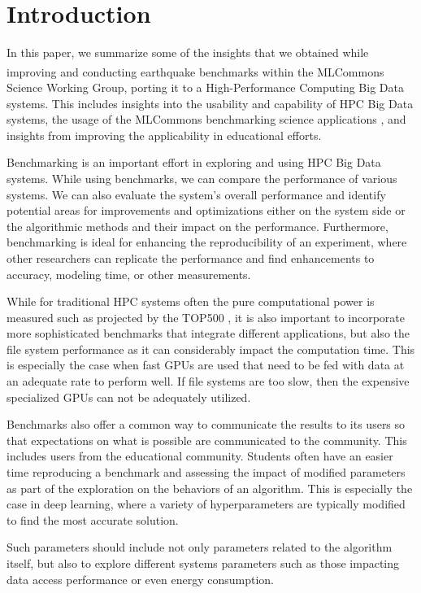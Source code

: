 \documentclass[utf8]{FrontiersinVancouver} %
\begin{document}
\section{Introduction}


In this paper, we summarize some of the insights that we obtained while improving and conducting earthquake benchmarks within the MLCommons\textsuperscript{\texttrademark} Science Working Group, porting it to a High-Performance Computing Big Data systems.  This includes insights into the usability and capability of HPC Big Data systems, the usage of the MLCommons benchmarking science applications \citep{las-22-mlcommons-science}, and insights from improving the applicability in educational efforts.

Benchmarking is an important effort in exploring and using HPC Big Data systems.  While using benchmarks, we can compare the performance of various systems. We can also evaluate the system's overall performance and identify potential areas for improvements and optimizations either on the system side or the algorithmic methods and their impact on the performance. Furthermore, benchmarking is ideal for enhancing the reproducibility of an experiment, where other researchers can replicate the performance and find enhancements to accuracy, modeling time, or other measurements.

While for traditional HPC systems often the pure computational power is measured such as projected by the TOP500 \cite{dongarra1997top500,www-top500}, it is also important to incorporate more sophisticated benchmarks that integrate different applications, but also the file system performance as it can considerably impact the computation time. This is especially the case when fast GPUs are used that need to be fed with data at an adequate rate to perform well. If file systems are too slow, then the expensive specialized GPUs can not be adequately utilized.

Benchmarks also offer a common way to communicate the results to its users so that expectations on what is possible are communicated to the community. This includes users from the educational community. Students often have an easier time reproducing a benchmark and assessing the impact of modified parameters as part of the exploration on the behaviors of an algorithm. This is especially the case in deep learning, where a variety of hyperparameters are typically modified to find the most accurate solution.

Such parameters should include not only parameters related to the algorithm itself, but also to explore different systems parameters such as those impacting data access performance or even energy consumption.
\end{document}
